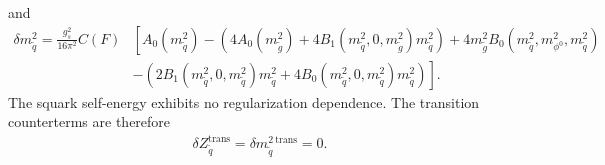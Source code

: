 and
\begin{align}
\delta m_{\tilde{q}}^2 = \frac{g_s^2}{16\pi^2}C(F)&\left[ A_0(m_{\tilde{q}}^2) - (4A_0(m_{\tilde{g}}^2) + 4B_1(m_{\tilde{q}}^2,0,m_{\tilde{g}}^2)m_{\tilde{q}}^2) + 4 m_{\tilde{g}}^2 B_0(m_{\tilde{q}}^2,m_{\phi^0}^2,m_{\tilde{q}}^2) \right.\nonumber\\
&\left. -(2B_1(m_{\tilde{q}}^2,0,m_{\tilde{q}}^2) m_{\tilde{q}}^2 + 4 B_0(m_{\tilde{q}}^2,0,m_{\tilde{q}}^2)m_{\tilde{q}}^2) \right].
\end{align}
The squark self-energy exhibits no regularization dependence. The transition counterterms are therefore 
\begin{align}
\delta Z_{\tilde{q}}^{\mathrm{trans}} = \delta m_{\tilde{q}}^{2\ \mathrm{trans}} = 0. \label{eq:SquarkSC}
\end{align}

